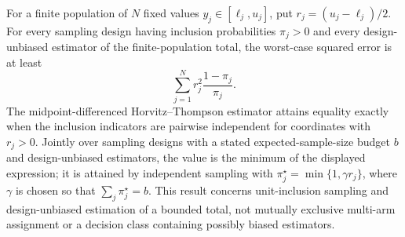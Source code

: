 For a finite population of \(N\) fixed values \(y_j\in[\ell_j,u_j]\), put \(r_j=(u_j-\ell_j)/2\). For every sampling design having inclusion probabilities \(\pi_j>0\) and every design-unbiased estimator of the finite-population total, the worst-case squared error is at least
\[
 \sum_{j=1}^N r_j^2\frac{1-\pi_j}{\pi_j}.
\]
The midpoint-differenced Horvitz--Thompson estimator attains equality exactly when the inclusion indicators are pairwise independent for coordinates with \(r_j>0\). Jointly over sampling designs with a stated expected-sample-size budget \(b\) and design-unbiased estimators, the value is the minimum of the displayed expression; it is attained by independent sampling with \(\pi_j^\star=\min\{1,\gamma r_j\}\), where \(\gamma\) is chosen so that \(\sum_j\pi_j^\star=b\). This result concerns unit-inclusion sampling and design-unbiased estimation of a bounded total, not mutually exclusive multi-arm assignment or a decision class containing possibly biased estimators.